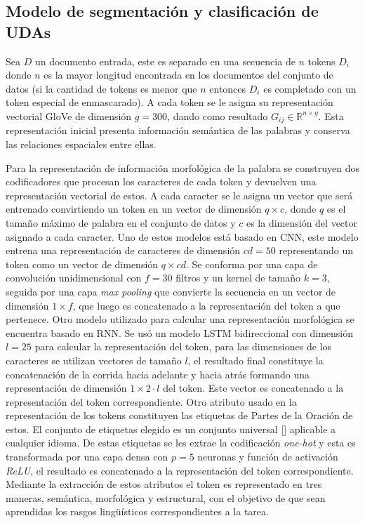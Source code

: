\subsection{Modelo de segmentación y clasificación de UDAs}

Sea $D$ un documento entrada, este es separado en una secuencia de $n$ tokens $D_i$ donde $n$ es la mayor longitud encontrada
en los documentos del conjunto de datos (si la cantidad de tokens es menor que $n$ entonces $D_i$ es completado con un token especial de enmascarado). 
A cada token se le asigna
su representación vectorial GloVe de dimensión $g=300$, dando como resultado $G_{ij} \in \mathbb{R}^{n \times g}$.
Esta representación inicial presenta información semántica de las palabras y conserva las relaciones 
espaciales entre ellas. 

Para la representación de información morfológica de la palabra se construyen dos
codificadores que procesan los caracteres de cada token y devuelven una representación vectorial de estos.
A cada caracter se le asigna un vector que será entrenado convirtiendo un token en un vector de dimensión
$q \times c$, donde $q$ es el tamaño máximo de palabra en el conjunto de datos y $c$ es la dimensión del vector
asignado a cada caracter.
Uno de estos modelos está basado en CNN, este modelo entrena una representación de caracteres de dimensión
$cd=50$ representando un token como un vector de dimensión $q \times cd$. Se conforma por una capa de convolución unidimensional
con $f=30$ filtros y un kernel de tamaño $k=3$, seguida por una capa \emph{max pooling} que convierte la secuencia en un vector
de dimensión $1 \times f$, que luego es concatenado a la representación del token a que pertenece.
Otro modelo utilizado para calcular una representación morfológica se encuentra basado en RNN. Se usó
un modelo LSTM bidireccional con dimensión $l=25$ para calcular la representación del token, para las dimensiones de los caracteres se
utilizan vectores de tamaño $l$, el resultado final constituye la concatenación de la corrida hacia adelante y
hacia atrás formando una representación de dimensión $1 \times 2 \cdot l$ del token. Este vector es concatenado a la representación
del token correspondiente. Otro atributo usado en la representación de los tokens constituyen las etiquetas de 
Partes de la Oración de estos.
El conjunto de etiquetas elegido es un conjunto universal [\cite{petrov2011universal}] aplicable a cualquier idioma.
De estas etiquetas se les extrae la codificación \emph{one-hot} y esta es transformada por una capa densa con $p=5$ neuronas
y función de activación \emph{ReLU}, el resultado es concatenado a la representación del token correspondiente. Mediante 
la extracción de estos atributos el token es representado en tres maneras, semántica, morfológica y estructural, con el 
objetivo de que sean aprendidas los rasgos lingüísticos correspondientes a la tarea.

